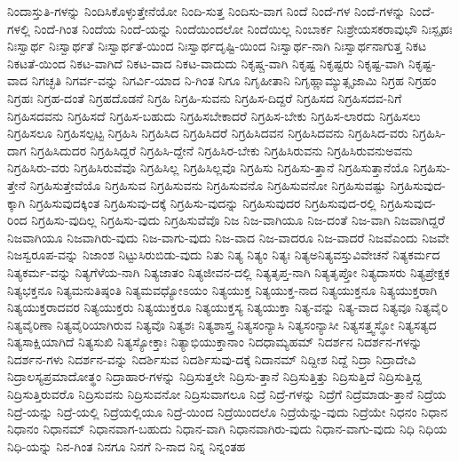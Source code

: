{ನಿಂದಾಸ್ತುತಿ-ಗಳನ್ನು
ನಿಂದಿಸಿಕೊಳ್ಳುತ್ತೇನೆಯೋ
ನಿಂದಿ-ಸುತ್ತ
ನಿಂದಿಸು-ವಾಗ
ನಿಂದೆ
ನಿಂದೆ-ಗಳ
ನಿಂದೆ-ಗಳನ್ನು
ನಿಂದೆ-ಗಳಲ್ಲಿ
ನಿಂದೆ-ಗಿಂತ
ನಿಂದೆಯ
ನಿಂದೆ-ಯನ್ನು
ನಿಂದೆಯಿಂದಲೋ
ನಿಂದೆಯಿಲ್ಲ
ನಿಂಬಾರ್ಕ
ನಿಃಶ್ರೇಯಸಕರಾವುಭೌ
ನಿಃಸ್ಪೃಹಃ
ನಿಃಸ್ವಾರ್ಥ
ನಿಃಸ್ವಾರ್ಥತೆ
ನಿಃಸ್ವಾರ್ಥತೆ-ಯಿಂದ
ನಿಃಸ್ವಾರ್ಥದೃಷ್ಟಿ-ಯಿಂದ
ನಿಃಸ್ವಾರ್ಥ-ನಾಗಿ
ನಿಃಸ್ವಾರ್ಥನಾಗುತ್ತ
ನಿಕಟ
ನಿಕಟತೆ-ಯಿಂದ
ನಿಕಟ-ವಾಗಿದೆ
ನಿಕಟ-ವಾದ
ನಿಕಟ-ವಾದುದು
ನಿಕೃಷ್ಚ-ವಾಗಿ
ನಿಕೃಷ್ಟ
ನಿಕೃಷ್ಟರು
ನಿಕೃಷ್ಟ-ವಾಗಿ
ನಿಕೃಷ್ಟ-ವಾದ
ನಿಗಚ್ಛತಿ
ನಿಗರ್ವ-ವನ್ನು
ನಿಗರ್ವಿ-ಯಾದ
ನಿ-ಗಿಂತ
ನಿಗೂ
ನಿಗೃಹೀತಾನಿ
ನಿಗೃಹ್ಣಾಮ್ಯುತ್ಸೃಜಾಮಿ
ನಿಗ್ರಹ
ನಿಗ್ರಹಂ
ನಿಗ್ರಹಃ
ನಿಗ್ರಹ-ದಂತೆ
ನಿಗ್ರಹದೊಡನೆ
ನಿಗ್ರಹಿ
ನಿಗ್ರಹಿ-ಸುವನು
ನಿಗ್ರಹಿಸ-ದಿದ್ದರೆ
ನಿಗ್ರಹಿಸದ
ನಿಗ್ರಹಿಸದವ-ನಿಗೆ
ನಿಗ್ರಹಿಸದವನು
ನಿಗ್ರಹಿಸದೆ
ನಿಗ್ರಹಿಸ-ಬಹುದು
ನಿಗ್ರಹಿಸಬೇಕಾದರೆ
ನಿಗ್ರಹಿಸ-ಬೇಕು
ನಿಗ್ರಹಿಸ-ಲಾರದು
ನಿಗ್ರಹಿಸಲು
ನಿಗ್ರಹಿಸಲೂ
ನಿಗ್ರಹಿಸಲ್ಪಟ್ಟ
ನಿಗ್ರಹಿಸಿ
ನಿಗ್ರಹಿಸಿದ
ನಿಗ್ರಹಿಸಿದರೆ
ನಿಗ್ರಹಿಸಿದವನ
ನಿಗ್ರಹಿಸಿದವನು
ನಿಗ್ರಹಿಸಿದ-ವರು
ನಿಗ್ರಹಿಸಿ-ದಾಗ
ನಿಗ್ರಹಿಸಿದುದರ
ನಿಗ್ರಹಿಸಿದ್ದರೆ
ನಿಗ್ರಹಿಸಿ-ದ್ದೇನೆ
ನಿಗ್ರಹಿಸಿರ-ಬೇಕು
ನಿಗ್ರಹಿಸಿರುವನು
ನಿಗ್ರಹಿಸಿರುವನುಅವನು
ನಿಗ್ರಹಿಸಿರು-ವರು
ನಿಗ್ರಹಿಸಿರುವೆವೊ
ನಿಗ್ರಹಿಸಿಲ್ಲ
ನಿಗ್ರಹಿಸಿಲ್ಲವೊ
ನಿಗ್ರಹಿಸು
ನಿಗ್ರಹಿಸು-ತ್ತಾನೆ
ನಿಗ್ರಹಿಸುತ್ತಾನೆಯೊ
ನಿಗ್ರಹಿಸು-ತ್ತೇನೆ
ನಿಗ್ರಹಿಸುತ್ತೇವೆಯೊ
ನಿಗ್ರಹಿಸುವ
ನಿಗ್ರಹಿಸುವನು
ನಿಗ್ರಹಿಸುವನೊ
ನಿಗ್ರಹಿಸುವನೋ
ನಿಗ್ರಹಿಸುವಷ್ಟು
ನಿಗ್ರಹಿಸುವುದ-ಕ್ಕಾಗಿ
ನಿಗ್ರಹಿಸುವುದಕ್ಕಿಂತ
ನಿಗ್ರಹಿಸುವು-ದಕ್ಕೆ
ನಿಗ್ರಹಿಸು-ವುದನ್ನು
ನಿಗ್ರಹಿಸುವುದರ
ನಿಗ್ರಹಿಸುವುದ-ರಲ್ಲಿ
ನಿಗ್ರಹಿಸುವುದ-ರಿಂದ
ನಿಗ್ರಹಿಸು-ವುದಿಲ್ಲ
ನಿಗ್ರಹಿಸು-ವುದು
ನಿಗ್ರಹಿಸುವೆವೊ
ನಿಜ
ನಿಜ-ವಾಗಿಯೂ
ನಿಜ-ದಂತೆ
ನಿಜ-ವಾಗಿ
ನಿಜವಾಗಿದ್ದರೆ
ನಿಜವಾಗಿಯೂ
ನಿಜವಾಗಿರು-ವುದು
ನಿಜ-ವಾಗು-ವುದು
ನಿಜ-ವಾದ
ನಿಜ-ವಾದರೂ
ನಿಜ-ವಾದರೆ
ನಿಜವೆಎಂದು
ನಿಜವೇ
ನಿಜಸ್ವರೂಪ-ವನ್ನು
ನಿಜಾಂಶ
ನಿಟ್ಟುಸಿರುಬಿಡು-ವುದು
ನಿತು
ನಿತ್ಯ
ನಿತ್ಯಂ
ನಿತ್ಯಃ
ನಿತ್ಯಅನಿತ್ಯವಸ್ತುವಿವೇಚನೆ
ನಿತ್ಯಕರ್ಮದ
ನಿತ್ಯಕರ್ಮ-ವನ್ನು
ನಿತ್ಯಗೆಳೆಯ-ನಾಗಿ
ನಿತ್ಯಜಾತಂ
ನಿತ್ಯಜೀವನ-ದಲ್ಲಿ
ನಿತ್ಯತೃಪ್ತ-ನಾಗಿ
ನಿತ್ಯತೃಪ್ತೋ
ನಿತ್ಯದಾಸರು
ನಿತ್ಯಪ್ರೇಕ್ಷಕ
ನಿತ್ಯಭಕ್ತನೂ
ನಿತ್ಯಮನುತಿಷ್ಠಂತಿ
ನಿತ್ಯಮವಧ್ಯೋಽಯಂ
ನಿತ್ಯಯುಕ್ತ
ನಿತ್ಯಯುಕ್ತ-ನಾದ
ನಿತ್ಯಯುಕ್ತನೂ
ನಿತ್ಯಯುಕ್ತರಾಗಿ
ನಿತ್ಯಯುಕ್ತರಾದವರ
ನಿತ್ಯಯುಕ್ತರು
ನಿತ್ಯಯುಕ್ತರೂ
ನಿತ್ಯಯುಕ್ತಸ್ಯ
ನಿತ್ಯಯುಕ್ತಾ
ನಿತ್ಯ-ವನ್ನು
ನಿತ್ಯ-ವಾದ
ನಿತ್ಯವೂ
ನಿತ್ಯವೈರಿ
ನಿತ್ಯವೈರಿಣಾ
ನಿತ್ಯವೈರಿಯಾಗಿರುವ
ನಿತ್ಯವೊ
ನಿತ್ಯಶಃ
ನಿತ್ಯಶಾಸ್ತ್ರ
ನಿತ್ಯಸಂನ್ಯಾಸಿ
ನಿತ್ಯಸಂನ್ಯಾಸೀ
ನಿತ್ಯಸತ್ತ್ವಸ್ಥೋ
ನಿತ್ಯಸತ್ಯದ
ನಿತ್ಯಸಾಕ್ಷಿಯಾಗಿದೆ
ನಿತ್ಯಸುಖಿ
ನಿತ್ಯಸ್ಯೋಕ್ತಾಃ
ನಿತ್ಯಾಭಿಯುಕ್ತಾನಾಂ
ನಿದಧಾಮ್ಯಹಮ್
ನಿದರ್ಶನ
ನಿದರ್ಶನ-ಗಳನ್ನು
ನಿದರ್ಶನ-ಗಳು
ನಿದರ್ಶನ-ವನ್ನು
ನಿದರ್ಶಿಸುವ
ನಿದರ್ಶಿಸುವು-ದಕ್ಕೆ
ನಿದಾನಮ್
ನಿದ್ದೀಶ
ನಿದ್ದೆ
ನಿದ್ರಾ
ನಿದ್ರಾದೇವಿ
ನಿದ್ರಾಲಸ್ಯಪ್ರಮಾದೋತ್ಥಂ
ನಿದ್ರಾಹಾರ-ಗಳನ್ನು
ನಿದ್ರಿಸುತ್ತಲೇ
ನಿದ್ರಿಸು-ತ್ತಾನೆ
ನಿದ್ರಿಸುತ್ತಿತ್ತು
ನಿದ್ರಿಸುತ್ತಿದೆ
ನಿದ್ರಿಸುತ್ತಿದ್ದ
ನಿದ್ರಿಸುತ್ತಿರುವರೊ
ನಿದ್ರಿಸುವನು
ನಿದ್ರಿಸುವನೋ
ನಿದ್ರಿಸುವಾಗಲೂ
ನಿದ್ರೆ
ನಿದ್ರೆ-ಗಳನ್ನು
ನಿದ್ರೆಗೆ
ನಿದ್ರೆಮಾಡು-ತ್ತಾನೆ
ನಿದ್ರೆಯ
ನಿದ್ರೆ-ಯನ್ನು
ನಿದ್ರೆ-ಯಲ್ಲಿ
ನಿದ್ರೆಯಲ್ಲಿಯೂ
ನಿದ್ರೆ-ಯಿಂದ
ನಿದ್ರೆಯಿಂದಲೊ
ನಿದ್ರೆಯೆನ್ನು-ವುದು
ನಿದ್ರೆಯೇ
ನಿಧನಂ
ನಿಧಾನ
ನಿಧಾನಂ
ನಿಧಾನಮ್
ನಿಧಾನವಾಗ-ಬಹುದು
ನಿಧಾನ-ವಾಗಿ
ನಿಧಾನವಾಗಿರು-ವುದು
ನಿಧಾನ-ವಾಗು-ವುದು
ನಿಧಿ
ನಿಧಿಯ
ನಿಧಿ-ಯನ್ನು
ನಿನ-ಗಿಂತ
ನಿನಗೂ
ನಿನಗೆ
ನಿ-ನಾದ
ನಿನ್ನ
ನಿನ್ನಂತಹ
}
